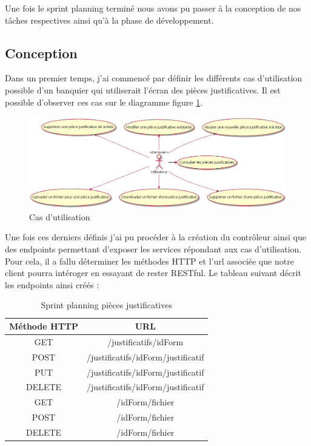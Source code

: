 	Une fois le sprint planning terminé nous avons pu passer à la conception de nos tâches respectives ainsi qu'à la phase de développement.

\subsection{Conception}

	Dans un premier temps, j'ai commencé par définir les différents cas d'utilisation possible d'un banquier qui utiliserait l'écran des pièces justificatives. Il est possible d'observer ces cas sur le diagramme figure \ref{useCasePJ}.

\begin{figure}[h!]
	\includegraphics[scale=0.50]{images/travailBP1818/piecesJustif/useCasePJ.png}
	\centering
	\caption{Cas d'utilisation}
	\label{useCasePJ}
\end{figure}

	Une fois ces derniers définis j'ai pu procéder à la création du contrôleur ainsi que des endpoints permettant d'exposer les services répondant aux cas d'utilisation. Pour cela, il a fallu déterminer les méthodes HTTP et l'url associée que notre client pourra intéroger en essayant de rester RESTful. Le tableau suivant décrit les endpoints ainsi créés :
	
\begin{table}[h!]
	\center
	\begin{tabular}{| c | c |}
     \hline
     Méthode HTTP & URL \\ \hline
     GET & /justificatifs/{idForm}\\ \hline
     POST & /justificatifs/{idForm}/justificatif\\ \hline
     PUT & /justificatifs/{idForm}/justificatif\\ \hline
     DELETE & /justificatifs/{idForm}/justificatif\\ \hline
     GET & /{idForm}/fichier\\ \hline
     POST & /{idForm}/fichier\\ \hline
     DELETE & /{idForm}/fichier\\ \hline
	\end{tabular}
	\caption{Sprint planning pièces justificatives}
	\label{sprintPlanningPJ}
\end{table}


